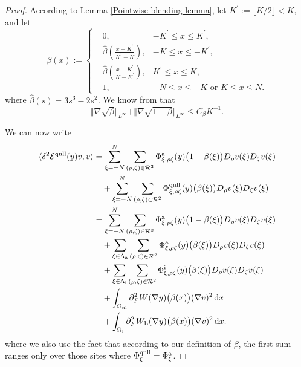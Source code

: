\begin{proof}
	According to Lemma \ref{Pointwise blending lemma}, let $K^{'}:=\lfloor K/2\rfloor <K$, and let
	\begin{equation*}
		\beta (x):=\left\{
		\begin{aligned}
			&0, &-K^{'}\le x \le K^{'},\\
			&\hat{\beta}(\frac{x+K^{'}}{K^{'}-K}), &-K\le x \le -K^{'},\\
			&\hat{\beta} (\frac{x-K^{'}}{K-K^{'}}), &K^{'} \le x \le K,\\
			&1, &-N\le x \le -K \text{ or } K\le x\le N.
		\end{aligned}
		\right.
	\end{equation*}
	where $\hat{\beta}(s)=3s^{3}-2s^{2}$. We know from \cite[Section 8.3]{2013_ML_CO_AC_Coupling_ACTANUM} that 
	\begin{equation}\label{Property of beta}
		\Vert \nabla \sqrt{\beta} \Vert_{L^{\infty}} + \Vert \nabla \sqrt{1-\beta} \Vert_{L^{\infty}} \leq 	C_{\beta} K^{-1}.
	\end{equation}
	
	We can now write
	\begin{subequations}
		\begin{align}
			\langle \delta^{2} \mathcal{E}^{{\rm qnll}} (y)v,v\rangle &= \sum_{\xi=-N}^{N} \sum_{(\rho,\zeta)\in\mathcal{R}^{2}} \Phi^{{\rm a}}_{\xi,\rho\zeta} (y)\big(1-\beta(\xi)\big) D_{\rho}v(\xi) D_{\zeta}v(\xi) \nonumber\\
			&\quad +\sum_{\xi=-N}^{N} \sum_{(\rho,\zeta)\in\mathcal{R}^{2}} \Phi^{{\rm qnll}}_{\xi,\rho\zeta} (y)\big(\beta(\xi)\big) D_{\rho}v(\xi) D_{\zeta}v(\xi) \nonumber\\
			&= 
			\label{All atomistic stab}
			\sum_{\xi=-N}^{N} \sum_{(\rho,\zeta)\in\mathcal{R}^{2}} \Phi^{{\rm a}}_{\xi,\rho\zeta} (y)\big(1-\beta(\xi)\big) D_{\rho}v(\xi) D_{\zeta}v(\xi)\\
			\label{NL-L atomistic stab} 
			&\quad +\sum_{\xi \in \Lambda_{\rm a}} \sum_{(\rho,\zeta)\in\mathcal{R}^{2}} \Phi^{{\rm a}}_{\xi,\rho\zeta} (y)\big(\beta(\xi)\big)D_{\rho}v(\xi)D_{\zeta}v(\xi)\\
			\label{NL-L interaction stab} 
			&\quad +\sum_{\xi \in \Lambda_{\rm i}} \sum_{(\rho,\zeta)\in\mathcal{R}^{2}} \Phi^{{\rm i}}_{\xi,\rho\zeta} (y)\big(\beta(\xi)\big)D_{\rho}v(\xi)D_{\zeta}v(\xi)\\
			\label{NL-L nonlinear stab} 
			&\quad + \int_{\Omega_{{\rm nl}}} \partial_{F}^{2}W (\nabla y)\big(\beta (x)\big) (\nabla v)^{2}\,\text{d} x\\
			\label{NL-L linear stab} 
			&\quad +\int_{\Omega_{{\rm l}}}  \partial_{F}^{2}W_{{\rm L}} (\nabla y)\big(\beta (x)\big)(\nabla v)^{2}\,\text{d} x.
		\end{align}
	\end{subequations}
	where we also use the fact that according to our definition of $\beta$, the first sum ranges only over those sites where $\Phi^{{\rm qnll}}_{\xi} = \Phi^{{\rm a}}_{\xi}$.
	

\end{proof}
